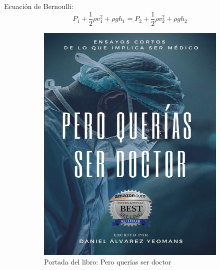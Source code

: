 \documentclass{article}
\begin{document}
\indent Ecuación de Bernoulli:
\begin{equation}
    P_1 + \frac{1}{2} \rho v_1^2 + \rho g h_1 = P_2 + \frac{1}{2} \rho v_2^2 + \rho g h_2
    \label{eq:bernoulli}
\end{equation}

\begin{figure}[H]
    \centering
    \begin{subfigure}[b]{0.45\textwidth}
        \centering
        \includegraphics[scale=0.25,angle=0]{doctor.png}
        \caption{Portada del libro: Pero querías ser doctor}\label{fig:doctor}
    \end{subfigure}
    \hfill
    \begin{subfigure}[b]{0.45\textwidth}
        \centering

\end{subfigure}
\end{figure}
\end{document}
